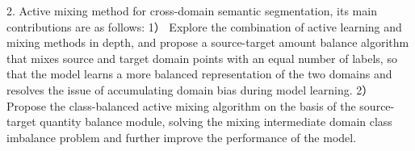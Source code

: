 2. Active mixing method for cross-domain semantic segmentation, its main contributions are as follows:
 1） Explore the combination of active learning and mixing methods in depth, and propose a source-target amount balance algorithm that mixes source and target domain points with an equal number of labels, so that the model learns a more balanced representation of the two domains and resolves the issue of accumulating domain bias during model learning.
2） Propose the class-balanced active mixing algorithm on the basis of the source-target quantity balance module, solving the mixing intermediate domain class imbalance problem and further improve the performance of the model.

